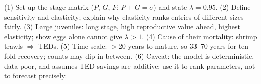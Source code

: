 \begin{longans}
(1) Set up the stage matrix ($P$, $G$, $F$; $P+G=\sigma$) and state $\lambda=0.95$. (2) Define sensitivity and
elasticity; explain why elasticity ranks entries of different sizes fairly. (3) Large juveniles: long stage, high
reproductive value ahead, highest elasticity; show eggs alone cannot give $\lambda>1$. (4) Cause of their mortality:
shrimp trawls $\Rightarrow$ TEDs. (5) Time scale: $>$20 years to mature, so 33--70 years for ten-fold recovery;
counts may dip in between. (6) Caveat: the model is deterministic, data poor, and assumes TED savings are additive;
use it to rank parameters, not to forecast precisely.
\end{longans}

